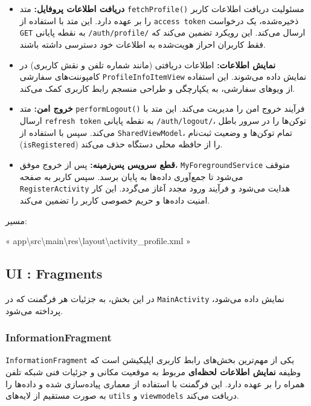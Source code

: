 \documentclass{report}
\begin{document}
\begin{itemize}
	\item \textbf{دریافت اطلاعات پروفایل:} متد \texttt{fetchProfile()} مسئولیت دریافت اطلاعات کاربر را بر عهده دارد. این متد با استفاده از \texttt{access token} ذخیره‌شده، یک درخواست \texttt{GET} به نقطه پایانی \texttt{/auth/profile/} ارسال می‌کند. این رویکرد تضمین می‌کند که فقط کاربران احراز هویت‌شده به اطلاعات خود دسترسی داشته باشند.
	
	\item \textbf{نمایش اطلاعات:} اطلاعات دریافتی (مانند شماره تلفن و نقش کاربری) در کامپوننت‌های سفارشی \texttt{ProfileInfoItemView} نمایش داده می‌شوند. این استفاده از ویوهای سفارشی، به یکپارچگی و طراحی منسجم رابط کاربری کمک می‌کند.
	
	\item \textbf{خروج امن:} متد \texttt{performLogout()} فرآیند خروج امن را مدیریت می‌کند. این متد با ارسال \texttt{refresh token} به نقطه پایانی \texttt{/auth/logout/}، توکن‌ها را در سرور باطل می‌کند. سپس با استفاده از \texttt{SharedViewModel}، تمام توکن‌ها و وضعیت ثبت‌نام (\texttt{isRegistered}) را از حافظه محلی دستگاه حذف می‌کند.
	
	\item \textbf{قطع سرویس پس‌زمینه:} پس از خروج موفق، \texttt{MyForegroundService} متوقف می‌شود تا جمع‌آوری داده‌ها به پایان برسد. سپس کاربر به صفحه \texttt{RegisterActivity} هدایت می‌شود و فرآیند ورود مجدد آغاز می‌گردد. این کار امنیت داده‌ها و حریم خصوصی کاربر را تضمین می‌کند.
\end{itemize}
\begin{note}{مسیر:}
	\begin{latin}
		« app\textbackslash src\textbackslash main\textbackslash res\textbackslash layout\textbackslash activity\_profile.xml »
	\end{latin}
\end{note}
\subsection{UI : Fragments}


در این بخش، به جزئیات هر فرگمنت که در \texttt{MainActivity} نمایش داده می‌شود، پرداخته می‌شود.

\subsubsection{InformationFragment}


\texttt{InformationFragment} یکی از مهم‌ترین بخش‌های رابط کاربری اپلیکیشن است که وظیفه 
\textbf{نمایش اطلاعات لحظه‌ای} مربوط به موقعیت مکانی و جزئیات فنی شبکه تلفن همراه را بر عهده دارد. 
این فرگمنت با استفاده از معماری  پیاده‌سازی شده و داده‌ها را 
به صورت مستقیم از لایه‌های \texttt{utils} و \texttt{viewmodels} دریافت می‌کند.
\end{document}
